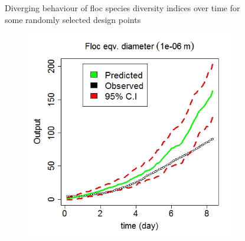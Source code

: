 \begin{acknowledgements}
\begin{figure}[!ht]
\begin{subfigure}[b]{.50\textwidth}
\end{subfigure}\vspace*{-1.5em}
\caption[]{Diverging behaviour of floc species diversity indices over time for some randomly selected design points}\label{div}
\end{figure}


\begin{figure}[!ht]
\begin{subfigure}[b]{.6\textwidth}
\includegraphics[width=1\textwidth]{p1d/p1d_2}
\end{subfigure}\hspace*{-.5em}
\centering
\begin{subfigure}[b]{.60\textwidth}

\end{subfigure}
\end{figure}
\end{acknowledgements}
